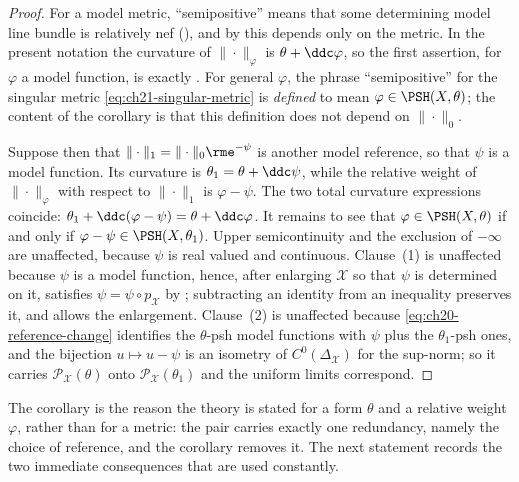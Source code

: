 \begin{proof}
For a model metric, ``semipositive'' means that some determining model line
bundle is relatively nef (), and by
 this depends only on the metric.  In the
present notation the curvature of $\|\cdot\|_\varphi$ is
$\theta+\ddc\varphi$, so the first assertion, for $\varphi$ a model
function, is exactly .  For general
$\varphi$, the phrase ``semipositive'' for the singular metric
\eqref{eq:ch21-singular-metric} is \emph{defined} to mean
$\varphi\in\PSH(X,\theta)$; the content of the corollary is that this
definition does not depend on $\|\cdot\|_0$.

Suppose then that $\|\cdot\|_1=\|\cdot\|_0\rme^{-\psi}$ is another model
reference, so that $\psi$ is a model function.  Its curvature is
$\theta_1=\theta+\ddc\psi$, while the relative weight of
$\|\cdot\|_\varphi$ with respect to $\|\cdot\|_1$ is
$\varphi-\psi$.  The two total curvature expressions coincide:
$\theta_1+\ddc(\varphi-\psi)=\theta+\ddc\varphi$.  It remains to see that
$\varphi\in\PSH(X,\theta)$ if and only if
$\varphi-\psi\in\PSH(X,\theta_1)$.  Upper semicontinuity and the exclusion
of $-\infty$ are unaffected, because $\psi$ is real valued and
continuous.  Clause~(1) is unaffected because $\psi$ is a model function,
hence, after enlarging $\mathcal X$ so that $\psi$ is determined on it,
satisfies $\psi=\psi\circ p_{\mathcal X}$ by
; subtracting an identity from an inequality
preserves it, and  allows the
enlargement.  Clause~(2) is unaffected because
\eqref{eq:ch20-reference-change} identifies the $\theta$-psh model
functions with $\psi$ plus the $\theta_1$-psh ones, and the bijection
$u\mapsto u-\psi$ is an isometry of $C^0(\Delta_{\mathcal X})$ for the
sup-norm; so it carries $\mathcal P_{\mathcal X}(\theta)$ onto
$\mathcal P_{\mathcal X}(\theta_1)$ and the uniform limits correspond.
\end{proof}

The corollary is the reason the theory is stated for a form $\theta$ and a
relative weight $\varphi$, rather than for a metric: the pair carries
exactly one redundancy, namely the choice of reference, and the corollary
removes it.  The next statement records the two immediate consequences that
are used constantly.

